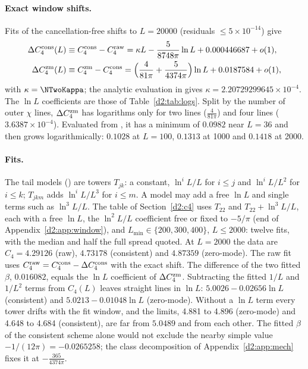 \paragraph{Exact window shifts.} Fits of the cancellation-free shifts to $L=20000$ (residuals $\le5\times10^{-14}$) give
\begin{align}
 \Delta C_4^{\rm cons}(L)&\equiv C_4^{\rm cons}-C_4^{\rm raw}=\kappa L-\frac5{8748\pi}\ln L+0.000446687+o(1),\nonumber\\
 \Delta C_4^{\rm zm}(L)&\equiv C_4^{\rm zm}-C_4^{\rm cons}=\Big(\frac4{81\pi}+\frac5{4374\pi}\Big)\ln L+0.0187584+o(1),
 \label{d2:eq:dC4shifts}
\end{align}
with $\kappa=\NTwoKappa$; the analytic evaluation in  gives
$\kappa=2.20729299645\times10^{-4}$. The $\ln L$ coefficients are those of Table~\ref{d2:tab:logs}. Split by the number of
outer $\chi$ lines, $\Delta C_4^{\rm zm}$ has logarithms only for two lines ($\frac4{81\pi}$) and four lines
($3.6387\times10^{-4}$). Evaluated from , it has a minimum of $0.0982$ near $L=36$ and then grows logarithmically: $0.1028$ at $L=100$,
$0.1313$ at 1000 and $0.1418$ at 2000.

\paragraph{Fits.} The tail models () are towers $T_{jk}$: a constant, $\ln^iL/L$ for $i\le j$ and
$\ln^iL/L^2$ for $i\le k$; $T_{jkm}$ adds $\ln^iL/L^3$ for $i\le m$. A model may add a free $\ln L$ and single terms such
as $\ln^3L/L$. The table of Section~\ref{d2:c4} uses $T_{22}$ and $T_{22}+\ln^3L/L$, each with a free $\ln L$, the $\ln^2L/L$
coefficient free or fixed to $-5/\pi$ (end of Appendix~\ref{d2:app:window}), and $L_{\min}\in\{200,300,400\}$, $L\le2000$: twelve fits, with the median and half
the full spread quoted. At $L=2000$ the data are $C_4=4.29126$ (raw), $4.73178$ (consistent) and $4.87359$ (zero-mode). The
raw fit uses $C_4^{\rm raw}=C_4^{\rm cons}-\Delta C_4^{\rm cons}$ with the exact shift. The difference of the two fitted
$\beta$, $0.016082$, equals the $\ln L$ coefficient of $\Delta C_4^{\rm zm}$. Subtracting the fitted $1/L$ and $1/L^2$
terms from $C_4(L)$ leaves straight lines in $\ln L$: $5.0026-0.02656\ln L$ (consistent) and $5.0213-0.01048\ln L$
(zero-mode). Without a $\ln L$ term every tower drifts with
the fit window, and the limits, 4.881 to 4.896 (zero-mode) and 4.648 to 4.684 (consistent), are far from $5.0489$ and from
each other. The fitted $\beta$ of the consistent scheme alone would not exclude the nearby simple value $-1/(12\pi)=-0.0265258$; the class
decomposition of Appendix~\ref{d2:app:mech} fixes it at $-\frac{365}{4374\pi}$.

